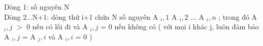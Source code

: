 Dòng 1: số nguyên N   
\\   Dòng 2...N+1: dòng thứ i+1 chứa N số nguyên A   $_    i,1   $   A   $_    i,2   $   ... A   $_    i,n   $   ; trong đó A   $_    i,j   $   $>$ 0 nếu có lối đi và A   $_    i,j   $   = 0 nếu không có ( với mọi i khác j, luôn đảm bảo A   $_    i,j   $   = A   $_    j,i   $   và A   $_    i,i   $   = 0 )